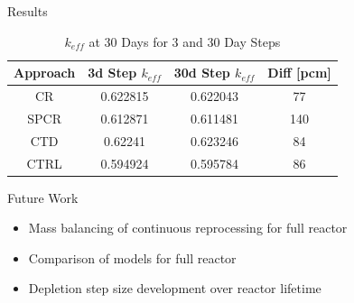 \documentclass[final]{beamer}
\newlength{\onecolwid}
\newlength{\threecolwid}
\begin{document}
\begin{frame}[t]
\begin{columns}[t,totalwidth=\threecolwid]
\begin{column}{\onecolwid}
\begin{block}{Results}
\begin{table}[H]
\renewcommand{\arraystretch}{1.25}
\caption{$k_{eff}$ at 30 Days for 3 and 30 Day Steps}
\label{tab:keff_vals}
\begin{tabular}{ | c | c | c | c | }
 \hline
 Approach & 3d Step $k_{eff}$ & 30d Step $k_{eff}$ & Diff [pcm]\\
 \hline
 \hline
 CR & 0.622815 & 0.622043 & 77\\
 SPCR & 0.612871 & 0.611481 & 140\\
 CTD & 0.62241 & 0.623246 & 84\\
 CTRL & 0.594924 & 0.595784 & 86\\

 \hline
\end{tabular}
\end{table}



\end{block}



\begin{alertblock}{Future Work }
\begin{itemize}
		\item Mass balancing of continuous reprocessing for full reactor
		\item Comparison of models for full reactor
		\item Depletion step size development over reactor lifetime
\end{itemize}

\end{alertblock}

%




\end{column}
\end{columns}
\end{frame}
\end{document}
